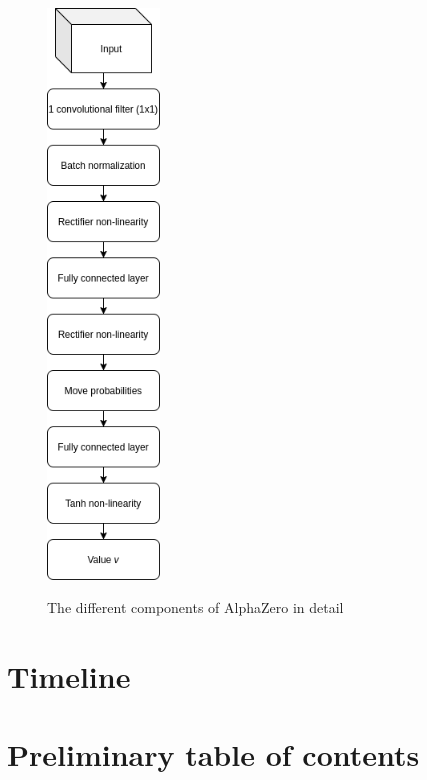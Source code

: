 \documentclass{../lib/llncs}
\begin{document}
\begin{adjustwidth}{-5in}{-5in}
\begin{figure}[!h]
{      \includegraphics[width=3cm, keepaspectratio]{alphazero_architecture_value_head.png}
    }
    \caption{The different components of AlphaZero in detail \cite{silver_mastering_2017}}
    \label{sumito}
  \end{figure}
\end{adjustwidth}

\section{Timeline}

\section{Preliminary table of contents}



\end{document}
